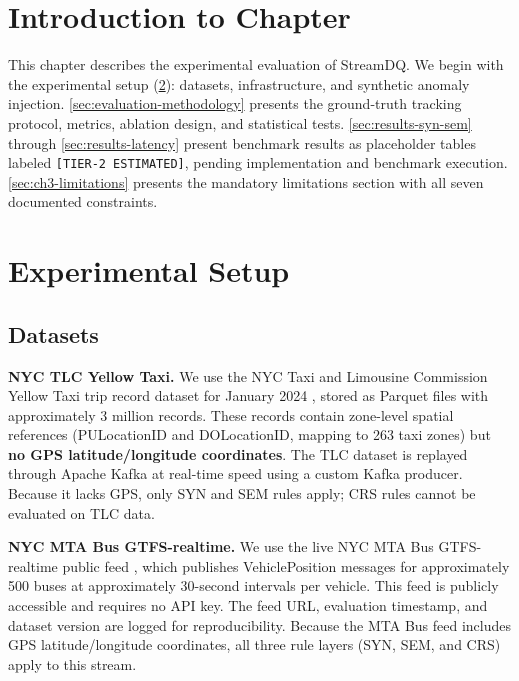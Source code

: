
\section{Introduction to Chapter}
\label{sec:ch3-intro}

This chapter describes the experimental evaluation of StreamDQ. We begin with the
experimental setup (\ref{sec:experimental-setup}): datasets, infrastructure,
and synthetic anomaly injection. \ref{sec:evaluation-methodology} presents the
ground-truth tracking protocol, metrics, ablation design, and statistical tests.
\ref{sec:results-syn-sem} through \ref{sec:results-latency} present benchmark
results as placeholder tables labeled \texttt{[TIER-2\ ESTIMATED]}, pending
implementation and benchmark execution. \ref{sec:ch3-limitations} presents
the mandatory limitations section with all seven documented constraints.

\section{Experimental Setup}
\label{sec:experimental-setup}

\subsection{Datasets}

\textbf{NYC TLC Yellow Taxi.} We use the NYC Taxi and Limousine Commission
Yellow Taxi trip record dataset for January 2024 \citep{nyc_tlc}, stored as
Parquet files with approximately 3 million records. These records contain
zone-level spatial references (PULocationID and DOLocationID, mapping to 263
taxi zones) but \textbf{no GPS latitude/longitude coordinates}. The TLC
dataset is replayed through Apache Kafka at real-time speed using a custom
Kafka producer. Because it lacks GPS, only SYN and SEM rules apply; CRS rules
cannot be evaluated on TLC data.

\textbf{NYC MTA Bus GTFS-realtime.} We use the live NYC MTA Bus GTFS-realtime
public feed \citep{nyc_mta_bus}, which publishes VehiclePosition messages for
approximately 500 buses at approximately 30-second intervals per vehicle.
This feed is publicly accessible and requires no API key. The feed URL,
evaluation timestamp, and dataset version are logged for reproducibility.
Because the MTA Bus feed includes GPS latitude/longitude coordinates, all
three rule layers (SYN, SEM, and CRS) apply to this stream.


